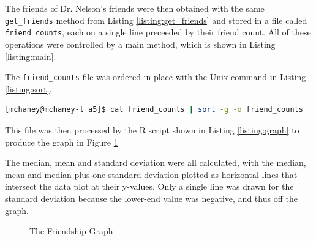 The friends of Dr. Nelson's friends were then obtained with the same {\tt get\_friends} method from Listing \ref{listing:get_friends} and stored in a file called {\tt friend\_counts}, each on a single line preceeded by their friend count. All of these operations were controlled by a main method, which is shown in Listing \ref{listing:main}.



\clearpage

The {\tt friend\_counts} file was ordered in place with the Unix command in Listing \ref{listing:sort}. 

\begin{lstlisting}[language=Bash,caption={Sort command},label=listing:sort]
[mchaney@mchaney-l a5]$ cat friend_counts | sort -g -o friend_counts
\end{lstlisting}

This file was then processed by the R script shown in Listing \ref{listing:graph} to produce the graph in Figure \ref{fig:friend_graph}



\clearpage
The median, mean and standard deviation were all calculated, with the median, mean and median plus one standard deviation plotted as horizontal lines that intersect the data plot at their y-values. Only a single line was drawn for the standard deviation because the lower-end value was negative, and thus off the graph. 

\begin{figure}[h!]
\centering
{}
\caption{The Friendship Graph}
\label{fig:friend_graph}
\end{figure}